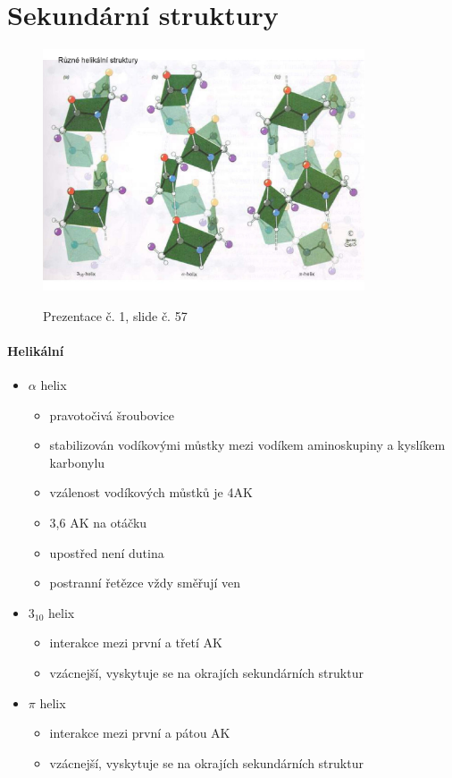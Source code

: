 \documentclass[DIV=8]{scrreprt}
\begin{document}
\section{Sekundární struktury} \label{Sekundární struktury}


\begin{figure}
    \caption{Prezentace č. 1, slide č. 57}
    \includegraphics[width=0.85\textwidth]{slides-1/slide-57.jpg}
    \centering
    \label{slides-1-slide-57}
\end{figure}

\paragraph{Helikální}
\begin{itemize}[nosep]
    \item \(\alpha\) helix
\begin{itemize}[nosep]
    \item pravotočivá šroubovice
    \item stabilizován vodíkovými můstky mezi vodíkem aminoskupiny a kyslíkem karbonylu
    \item vzálenost vodíkových můstků je 4AK
    \item 3,6 AK na otáčku
    \item upostřed není dutina
    \item postranní řetězce vždy směřují ven
\end{itemize}

    \item \(3_{10}\) helix
\begin{itemize}[nosep]
    \item interakce mezi první a třetí AK
    \item vzácnejší, vyskytuje se na okrajích sekundárních struktur
\end{itemize}

    \item \(\pi\) helix
\begin{itemize}[nosep]
    \item interakce mezi první a pátou AK
    \item vzácnejší, vyskytuje se na okrajích sekundárních struktur
\end{itemize}

\end{itemize}
\end{document}
